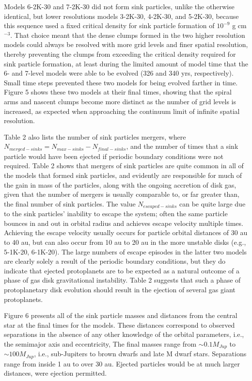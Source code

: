 \documentclass[12pt,preprint]{aastex}
\begin{document}
 Models 6-2K-30 and 7-2K-30 did not form sink particles, unlike the 
otherwise identical, but lower resolutions models 3-2K-30, 4-2K-30, and 5-2K-30,
because this sequence used a fixed critical density for sink particle formation
of $10^{-9}$ g cm$^{-3}$. That choice meant that the dense clumps formed
in the two higher resolution models could always be resolved with more
grid levels and finer spatial resolution, thereby preventing the clumps from
exceeding the critical density required for sink particle formation, at least
during the limited amount of model time that the 6- and 7-level models
were able to be evolved (326 and 340 yrs, respectively). Small time steps
prevented these two models for being evolved farther in time. Figure 5 shows
these two models at their final times, showing that the spiral arms and
nascent clumps become more distinct as the number of grid levels is
increased, as expected when approaching the continuum limit of infinite
spatial resolution.

 Table 2 also lists the number of sink particles mergers,  where 
$N_{merged-sinks} = N_{max-sinks} - N_{final-sinks}$, and the number of
times that a sink particle would have been ejected if periodic boundary 
conditions were not required. Table 2 shows that mergers of sink
particles are quite common in all of the models that formed sink particles,
and evidently are responsible for much of the gain in mass of the particles, 
along with the ongoing accretion of disk gas, given that the number of
mergers is usually comparable to, or far greater than, the final number of
sink particles. The value $N_{escaped-sinks}$ can be quite large 
due to the sink particles' inability to escape the system; often the same
particle bounces in and out in orbital radius and achieves escape velocity
multiple times. Achieving the escape velocity usually occurs for particle
orbital distances of 30 au to 40 au, but can also occur from 10 au to 20 au in
the more unstable disks (e.g., 5-1K-20, 6-1K-20). The large numbers of
escape episodes in the latter two models are clearly solely a result
of the periodic boundary conditions, but they do indicate that 
ejected protoplanets are to be expected as a natural outcome of
a phase of gas disk gravitational instability. Table 2 suggests that
such a phase of protoplanetary disk evolution should result in the
ejection of several gas giant protoplanets.

 Figure 6 presents all of the sink particle masses and distances from the
central star at the final times for the models. These distances correspond 
to observed separations in the absence of any other knowledge of the orbital 
parameters, i.e., the semimajor axis and eccentricity, The final masses
range from $\sim 0.1 M_{Jup}$ to $\sim 100 M_{Jup}$, i.e., sub-Jupiters
to brown dwarfs and late M dwarf stars. Separations range from inside
1 au to over 30 au. Ejected particles would be at much larger distances,
were ejection permitted. 
\end{document}
